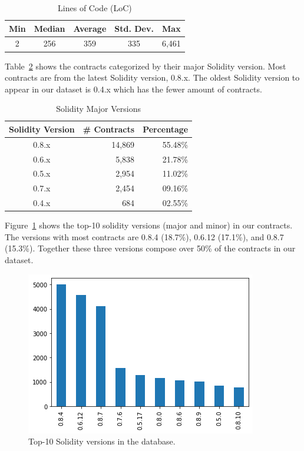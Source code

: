 \documentclass[10pt,conference]{IEEEtran}
\begin{document}
\begin{table}
\center
  \caption{Lines of Code (LoC)}
  \label{tab:loc}
  \begin{tabular}{c c c c c}
    \hline
    Min & Median & Average & Std. Dev. & Max \\
    \hline
   2 & 256 & 359 & 335 & 6,461 \\
  \hline
\end{tabular}
\end{table}


Table~\ref{tab:major-versions} shows the contracts categorized by their major Solidity version. Most contracts are from the latest Solidity version, 0.8.x. The oldest Solidity version to appear in our dataset is 0.4.x which has the fewer amount of contracts.

\begin{table}
\center
  \caption{Solidity Major Versions}
  \label{tab:major-versions}
  \begin{tabular}{crr}
    \hline
    Solidity Version & \# Contracts & Percentage\\
    \hline
    0.8.x & 14,869 &55.48\%\\
    0.6.x & 5,838 &21.78\%\\
    0.5.x & 2,954 &11.02\%\\
    0.7.x & 2,454 &09.16\%\\
    0.4.x & 684 &02.55\%\\
  \hline
\end{tabular}
\end{table}

Figure~\ref{fig:minor-versions} shows the top-10 solidity versions (major and minor) in our contracts. The versions with most contracts are 0.8.4 (18.7\%), 0.6.12 (17.1\%), and 0.8.7 (15.3\%). Together these three versions compose over 50\% of the contracts in our dataset.

\begin{figure}[h]
  \centering
  \includegraphics[width=\linewidth]{img/versions_clean.png}
  \caption{Top-10 Solidity versions in the database.}
  \label{fig:minor-versions}
\end{figure}
\end{document}
